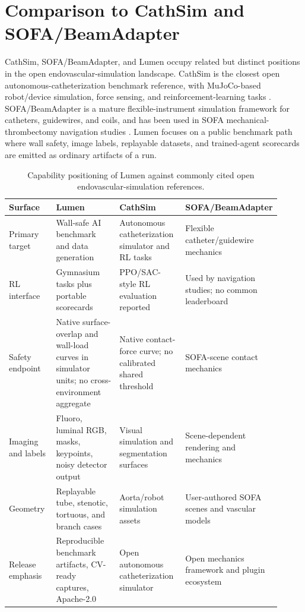 \documentclass[11pt]{article}
\begin{document}
\section{Comparison to CathSim and SOFA/BeamAdapter}

CathSim, SOFA/\allowbreak BeamAdapter, and Lumen occupy related but distinct positions in the open endovascular-simulation landscape. CathSim is the closest open autonomous-catheterization benchmark reference, with MuJoCo-based robot/device simulation, force sensing, and reinforcement-learning tasks \cite{jianu2022cathsim,jianu2024cathsim}. SOFA/\allowbreak BeamAdapter is a mature flexible-instrument simulation framework for catheters, guidewires, and coils, and has been used in SOFA mechanical-thrombectomy navigation studies \cite{allard2007sofa,beamadapter,robertshaw2024mt}. Lumen focuses on a public benchmark path where wall safety, image labels, replayable datasets, and trained-agent scorecards are emitted as ordinary artifacts of a run.

\begin{table}[H]
  \centering
  \caption{Capability positioning of Lumen against commonly cited open endovascular-simulation references.}
  \label{tab:comparison}
  \small
  \setlength{\tabcolsep}{4pt}
  \begin{tabular}{L{0.18\linewidth}L{0.25\linewidth}L{0.25\linewidth}L{0.23\linewidth}}
    \toprule
    Surface & Lumen & CathSim & SOFA/BeamAdapter \\
    \midrule
    Primary target & Wall-safe AI benchmark and data generation & Autonomous catheterization simulator and RL tasks & Flexible catheter/guidewire mechanics \\
    RL interface & Gymnasium tasks plus portable scorecards & PPO/SAC-style RL evaluation reported & Used by navigation studies; no common leaderboard \\
    Safety endpoint & Native surface-overlap and wall-load curves in simulator units; no cross-environment aggregate & Native contact-force curve; no calibrated shared threshold & SOFA-scene contact mechanics \\
    Imaging and labels & Fluoro, luminal RGB, masks, keypoints, noisy detector output & Visual simulation and segmentation surfaces & Scene-dependent rendering and mechanics \\
    Geometry & Replayable tube, stenotic, tortuous, and branch cases & Aorta/robot simulation assets & User-authored SOFA scenes and vascular models \\
    Release emphasis & Reproducible benchmark artifacts, CV-ready captures, Apache-2.0 & Open autonomous catheterization simulator & Open mechanics framework and plugin ecosystem \\
    \bottomrule
  \end{tabular}
\end{table}
\end{document}
